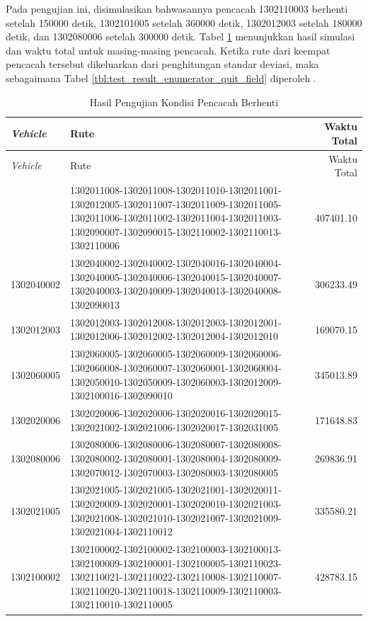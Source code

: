 Pada pengujian ini, disimulasikan bahwasannya pencacah 1302110003 berhenti setelah 150000 detik, 1302101005 setelah 360000 detik, 1302012003 setelah 180000 detik, dan 1302080006 setelah 300000 detik. Tabel \ref{tbl:test_result_enumerator_quit_field_pubsub_coes} menunjukkan hasil simulasi dan waktu total untuk masing-masing pencacah. Ketika rute dari keempat pencacah tersebut dikeluarkan dari penghitungan standar deviasi, maka sebagaimana Tabel \ref{tbl:test_result_enumerator_quit_field} diperoleh .


\begin{longtable}[h]{lp{8cm}r}
	\caption{Hasil Pengujian Kondisi Pencacah Berhenti}
	\label{tbl:test_result_enumerator_quit_field_pubsub_coes}\\
	\toprule
		\textit{Vehicle} & Rute & Waktu Total\\ 
	\midrule
	\endfirsthead
	\toprule
		\textit{Vehicle} & Rute & Waktu Total\\ 
	\midrule
	\endhead
	\bottomrule
	\endfoot
		1302011008 & 1302011008-1302011008-1302011010-1302011001-1302012005-1302011007-1302011009-1302011005-1302011006-1302011002-1302011004-1302011003-1302090007-1302090015-1302110002-1302110013-1302110006 & 407401.10 \\
		1302040002 & 1302040002-1302040002-1302040016-1302040004-1302040005-1302040006-1302040015-1302040007-1302040003-1302040009-1302040013-1302040008-1302090013 & 306233.49 \\
		1302012003 & 1302012003-1302012008-1302012003-1302012001-1302012006-1302012002-1302012004-1302012010 & 169070.15 \\
		1302060005 & 1302060005-1302060005-1302060009-1302060006-1302060008-1302060007-1302060001-1302060004-1302050010-1302050009-1302060003-1302012009-1302100016-1302090010 & 345013.89 \\
		1302020006 & 1302020006-1302020006-1302020016-1302020015-1302021002-1302021006-1302020017-1302031005 & 171648.83 \\
		1302080006 & 1302080006-1302080006-1302080007-1302080008-1302080002-1302080001-1302080004-1302080009-1302070012-1302070003-1302080003-1302080005 & 269836.91 \\
		1302021005 & 1302021005-1302021005-1302021001-1302020011-1302020009-1302020001-1302020010-1302021003-1302021008-1302021010-1302021007-1302021009-1302021004-1302110012 & 335580.21 \\
		1302100002 & 1302100002-1302100002-1302100003-1302100013-1302100009-1302100001-1302100005-1302110023-1302110021-1302110022-1302110008-1302110007-1302110020-1302110018-1302110009-1302110003-1302110010-1302110005 & 428783.15 \\

\end{longtable}
